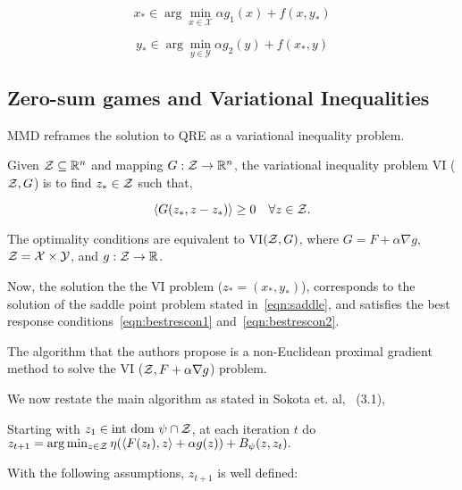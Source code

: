 \begin{equation}
	\label{eqn:bestrescon1} x_{\ast} \in \arg \min_{x \in \mathcal{X}} \alpha g_1(x) + f(x, y_{\ast})
\end{equation}

\begin{equation}
	\label{eqn:bestrescon2} y_{\ast} \in \arg
	\min_{y \in \mathcal{Y}} \alpha g_2(y) + f(x_{\ast}, y)
\end{equation}

\subsection{Zero-sum games and Variational Inequalities}

MMD reframes the
solution to QRE as a variational inequality problem.

\begin{definition}
	Given $\mathcal{Z} \subseteq \mathbb{R}^n$ and mapping $G: \mathcal{Z} \rightarrow \mathbb{R}^n$, the variational inequality
	problem VI ($\mathcal{Z}, G$) is to find $z_{\ast} \in \mathcal{Z}$ such that,

	\[ \langle
		G(z_{\ast}, z - z_{\ast}) \rangle \geq 0 \quad \forall z \in \mathcal{Z}.
	\]
\end{definition}

The optimality conditions are equivalent to VI$(\mathcal{Z}, G)$, where $G = F + \alpha \nabla g$, $\mathcal{Z}
	= \mathcal{X} \times \mathcal{Y}$, and $g: \mathcal{Z} \rightarrow \mathbb{R}$.

Now, the solution the the VI problem ($z_{\ast}= (x_{\ast}, y_{\ast})$), corresponds to the
solution of the saddle point problem stated in~\ref{eqn:saddle}, and satisfies the best response
conditions~\ref{eqn:bestrescon1} and~\ref{eqn:bestrescon2}.

The algorithm that the authors propose is a non-Euclidean proximal gradient method to solve the VI
($\mathcal{Z}, F + \alpha \nabla g$) problem.

We now restate the main algorithm as stated in Sokota et.
al,~\cite{sokotaUnified2023} (3.1),

\begin{alprocedure}
	\label{alg:proxgrad}
	Starting with $z_1 \in \text{int dom } \psi \cap \mathcal{Z}$, at each iteration $t$ do $z_{t+1} = \arg
		\min_{z \in \mathcal{Z}} \eta (\langle F(z_t), z\rangle + \alpha g(z)) + B_{\psi} (z, z_t).
	$
\end{alprocedure}

With the following assumptions, $z_{t+1}$ is well defined:

